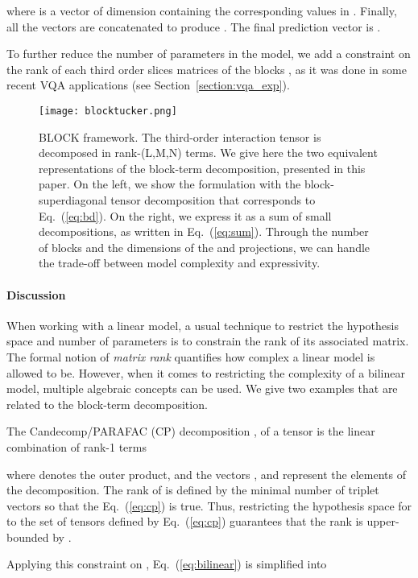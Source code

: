 \documentclass[letterpaper]{article} \usepackage{aaai19}  \usepackage{times}  \usepackage{helvet}  \usepackage{courier}  \usepackage{url}  \usepackage{graphicx}  \usepackage{booktabs}       \usepackage{comment}
\begin{document}
where  is a vector of dimension  containing the corresponding values in .
Finally, all the  vectors are concatenated to produce . The final prediction vector is . 

To further reduce the number of parameters in the model, we add a constraint on the rank of each third order slices matrices of the blocks , as it was done in some recent VQA applications (see Section~\ref{section:vqa_exp}).

\begin{figure}
 \texttt{[image: blocktucker.png]}
 \caption{\label{fig:blocktucker}
 BLOCK framework. The third-order interaction tensor is decomposed in  rank-(L,M,N) terms. We give here the two equivalent representations of the block-term decomposition, presented in this paper. On the left, we show the formulation with the block-superdiagonal tensor decomposition that corresponds to Eq.~(\ref{eq:bd}). On the right, we express it as a sum of small decompositions, as written in Eq.~(\ref{eq:sum}). Through the  number of blocks and the dimensions of the  and  projections, we can handle the trade-off between model complexity and expressivity.}
\end{figure}

\paragraph{Discussion}
When working with a linear model, a usual technique to restrict the hypothesis space and number of parameters is to constrain the rank of its associated matrix. The formal notion of \textit{matrix rank} quantifies how complex a linear model is allowed to be. However, when it comes to restricting the complexity of a bilinear model, multiple algebraic concepts can be used. We give two examples that are related to the block-term decomposition.


The Candecomp/PARAFAC (CP) decomposition \cite{Carroll1970}, \cite{Harshman2001FoundationsOT} of a tensor  is the linear combination of rank-1 terms 

where  denotes the outer product, and the vectors ,  and  represent the elements of the decomposition. The rank of  is defined by the minimal number  of triplet vectors so that the Eq.~(\ref{eq:cp}) is true.
Thus, restricting the hypothesis space for  to the set of tensors defined by Eq.~(\ref{eq:cp}) guarantees that the rank is upper-bounded by . 

Applying this constraint on , Eq.~(\ref{eq:bilinear}) is simplified into
\end{document}
